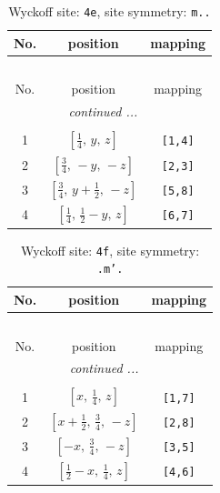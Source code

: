 \documentclass[fleqn,8pt]{jsarticle}
\begin{document}
\renewcommand{\arraystretch}{1.2}
\begin{longtable}{ccc}
\caption{Wyckoff site: {\tt 4e}, site symmetry: {\tt m..}}
 \\
 \hline \hline
No. & position & mapping \\ \hline \endfirsthead

\multicolumn{2}{l}{\tablename\ \thetable{}} \\
 \hline \hline
No. & position & mapping \\ \hline \endhead

 \hline \hline
\multicolumn{2}{r}{\footnotesize\it continued ...} \\ \endfoot

 \hline \hline
\multicolumn{2}{r}{} \\ \endlastfoot

1 & $\left[ \frac{1}{4},\, y,\, z \right]$ & {\tt [1,4]} \\ \hline
2 & $\left[ \frac{3}{4},\, - y,\, - z \right]$ & {\tt [2,3]} \\ \hline
3 & $\left[ \frac{3}{4},\, y + \frac{1}{2},\, - z \right]$ & {\tt [5,8]} \\ \hline
4 & $\left[ \frac{1}{4},\, \frac{1}{2} - y,\, z \right]$ & {\tt [6,7]} \\
\end{longtable}
\renewcommand{\arraystretch}{1.2}
\begin{longtable}{ccc}
\caption{Wyckoff site: {\tt 4f}, site symmetry: {\tt .m'.}}
 \\
 \hline \hline
No. & position & mapping \\ \hline \endfirsthead

\multicolumn{2}{l}{\tablename\ \thetable{}} \\
 \hline \hline
No. & position & mapping \\ \hline \endhead

 \hline \hline
\multicolumn{2}{r}{\footnotesize\it continued ...} \\ \endfoot

 \hline \hline
\multicolumn{2}{r}{} \\ \endlastfoot

1 & $\left[ x,\, \frac{1}{4},\, z \right]$ & {\tt [1,7]} \\ \hline
2 & $\left[ x + \frac{1}{2},\, \frac{3}{4},\, - z \right]$ & {\tt [2,8]} \\ \hline
3 & $\left[ - x,\, \frac{3}{4},\, - z \right]$ & {\tt [3,5]} \\ \hline
4 & $\left[ \frac{1}{2} - x,\, \frac{1}{4},\, z \right]$ & {\tt [4,6]} \\
\end{longtable}
\end{document}
